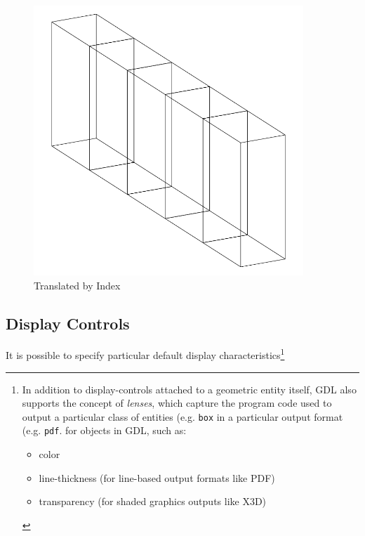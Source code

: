 \documentclass [11pt]{book}
\begin{document}
\begin{figure}
\begin{center}
\includegraphics[width=4in,height=4in]{../images/translate-by-index.pdf}
\end{center}

\caption{Translated by Index}

\label{fig:translate-by-index}

\end{figure}




\subsection{Display Controls}

\label{subsec:displaycontrols}



It is possible to specify particular default display
	 characteristics\footnote{In addition to display-controls attached to a geometric entity 
itself, GDL also supports the concept of \emph{lenses}, which capture the program code used to output a
		    particular class of  entities (e.g. \texttt{box} in a particular output format (e.g. \texttt{pdf}. for objects in GDL, such as: 

\begin{itemize}

\item color

\item line-thickness (for line-based output formats like PDF)

\item transparency (for shaded graphics outputs like X3D)

\end{itemize}

}
\end{document}
